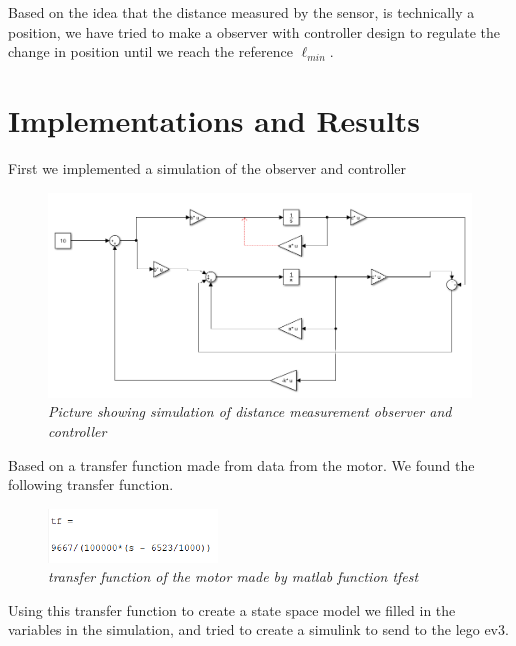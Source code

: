 \documentclass[a4paper,onecolumn,amsmath,amssymb]{revtex4-1}
\begin{document}
Based on the idea that the distance measured by the sensor, is technically a position, we have tried to make a observer with controller design to regulate the change in position until we reach the reference $\ell_{min}$.
\section{\textbf{Implementations and Results}}

First we implemented a simulation of the observer and controller


\FloatBarrier
\begin{figure}
	\includegraphics[width=\textwidth, trim= 0cm 0cm 0cm 0cm, clip]{project_simulation.png}
	\caption{\textit{Picture showing simulation of distance measurement observer and controller }\label{fig:projectsimulation}}
\end{figure}

Based on a transfer function made from data from the motor. We found the following transfer function.

\begin{figure}
	\includegraphics[width=0.4\textwidth]{Tf.png}
	\caption{\textit{transfer function of the motor made by matlab function tfest }\label{fig:transferfunction}}
\end{figure}
\FloatBarrier

Using this transfer function to create a state space model we filled in the variables in the simulation, and tried to create a simulink to send to the lego ev3.
\end{document}
